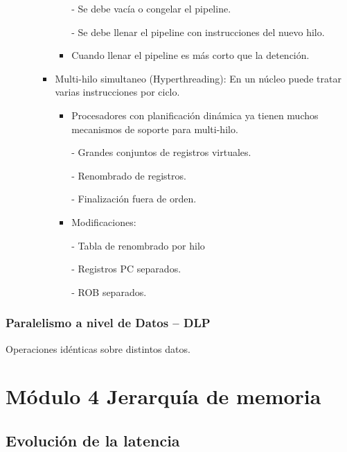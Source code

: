 \documentclass[12pt, twoside, openright]{report} %
\begin{document}
\begin{itemize}
\begin{itemize}
\begin{itemize}
\begin{itemize}
                - Se debe vacía o congelar el pipeline.

                - Se debe llenar el pipeline con instrucciones del nuevo hilo.
                \item Cuando llenar el pipeline es más corto que la detención.
              \end{itemize}
                  
              \item Multi-hilo simultaneo (Hyperthreading): En un núcleo puede tratar varias instrucciones por ciclo.
              \begin{itemize}
                \item Procesadores con planificación dinámica ya tienen muchos mecanismos de soporte para multi-hilo.
                
                - Grandes conjuntos de registros virtuales.

                - Renombrado de registros.

                - Finalización fuera de orden.
                \item Modificaciones:
                
                - Tabla de renombrado por hilo

                - Registros PC separados.

                - ROB separados.
              \end{itemize}
                  
            \end{itemize}
          \end{itemize}
      \end{itemize}
      \subsection{Paralelismo a nivel de Datos -- DLP}
          Operaciones idénticas sobre distintos datos.
  
  \chapter{Módulo 4 Jerarquía de memoria}
  \section{Evolución de la latencia}
\end{document}
